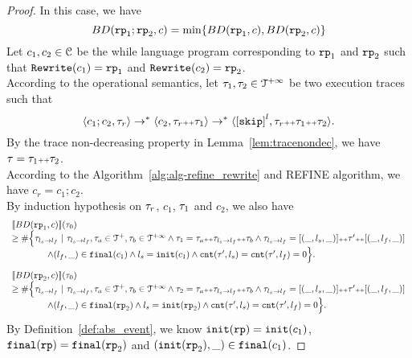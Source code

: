 \begin{proof}
In this case, we have
\[
  BD(\rprog_1; \rprog_2, c) = \min \left\{BD(\rprog_1, c), BD(\rprog_2, c) \right\}
\]
Let $c_1, c_2 \in \mathcal{C}$ be the while language program corresponding to $\mathtt{rp}_1$ and $\mathtt{rp}_2$ such that $\mathtt{Rewrite}(c_1) = \mathtt{rp}_1$ and $\mathtt{Rewrite}(c_2) = \mathtt{rp}_2$.
\\
According to the operational semantics, let $\mathtt{\tau}_1, \mathtt{\tau}_2 \in \mathcal{T}^{+\infty}$ be two execution traces such that 
\[
  \config{c_1; c_2, \trace_r} \to^* \config{c_2, \trace_r \tracecat \trace_1} \to^* \config{\clabel{\eskip}^{l}, \trace_r \tracecat \trace_1 \tracecat \trace_2}.
\]
By the trace non-decreasing property in Lemma~\ref{lem:tracenondec}, we have $\mathtt{\tau} = \mathtt{\tau}_1 {\scriptscriptstyle ++} \mathtt{\tau}_2$.
\\
According to the Algorithm~\ref{alg:alg-refine_rewrite} and REFINE algorithm, we have $c_r = c_1; c_2$.
\\
By induction hypothesis on $\mathtt{\tau}_r$, $c_1$, $\mathtt{\tau}_1$ and $c_2$, we also have
\[
  \begin{array}{l}
    \llbracket BD(\mathtt{rp}_1, c) \rrbracket(\mathtt{\tau}_0)
    \\ \geq
    \# \Big\{\mathtt{\tau}_{l_s \to l_f} ~\vert~ \mathtt{\tau}_{l_s \to l_f}, \mathtt{\tau}_a \in \mathcal{T}^{+}, \mathtt{\tau}_b \in \mathcal{T}^{+\infty}
    \land \mathtt{\tau}_1 = \mathtt{\tau}_a {\scriptscriptstyle ++} \mathtt{\tau}_{l_s \to l_f} {\scriptscriptstyle ++} \mathtt{\tau}_b
    \land \mathtt{\tau}_{l_s \to l_f} = [(\_, l_s, \_)] {\scriptscriptstyle ++} \mathtt{\tau}' {\scriptscriptstyle ++} [(\_, l_f, \_)]
    \\ \qquad \qquad
    \land (l_{f}, \_) \in \mathtt{final}(c_1)
    \land l_s = \mathtt{init}(c_1)
    \land \mathtt{cnt}(\mathtt{\tau}', l_s) = \mathtt{cnt}(\mathtt{\tau}', l_f) = 0 
    \Big\}.
    \end{array}
\]
%
\[
  \begin{array}{l}
    \llbracket BD(\mathtt{rp}_2, c) \rrbracket(\mathtt{\tau}_0)
    \\ \geq
    \# \Big\{\mathtt{\tau}_{l_s \to l_f} ~\vert~ \mathtt{\tau}_{l_s \to l_f}, \mathtt{\tau}_a \in \mathcal{T}^{+}, \mathtt{\tau}_b \in \mathcal{T}^{+\infty}
    \land \mathtt{\tau}_2 = \mathtt{\tau}_a {\scriptscriptstyle ++} \mathtt{\tau}_{l_s \to l_f} {\scriptscriptstyle ++} \mathtt{\tau}_b
    \land \mathtt{\tau}_{l_s \to l_f} = [(\_, l_s, \_)] {\scriptscriptstyle ++} \mathtt{\tau}' {\scriptscriptstyle ++} [(\_, l_f, \_)]
    \\ \qquad \qquad
    \land (l_{f}, \_) \in \mathtt{final}(\mathtt{rp}_2)
    \land l_s = \mathtt{init}(\mathtt{rp}_2)
    \land \mathtt{cnt}(\mathtt{\tau}', l_s) = \mathtt{cnt}(\mathtt{\tau}', l_f) = 0 
    \Big\}.
    \end{array}
\]
By Definition~\ref{def:abs_event}, we know
$\mathtt{init}(\mathtt{rp}) = \mathtt{init}(c_1)$, $\mathtt{final}(\mathtt{rp}) = \mathtt{final}(\mathtt{rp}_2)$ and $(\mathtt{init}(\mathtt{rp}_2), \_) \in \mathtt{final}(c_1)$. 

\end{proof}
